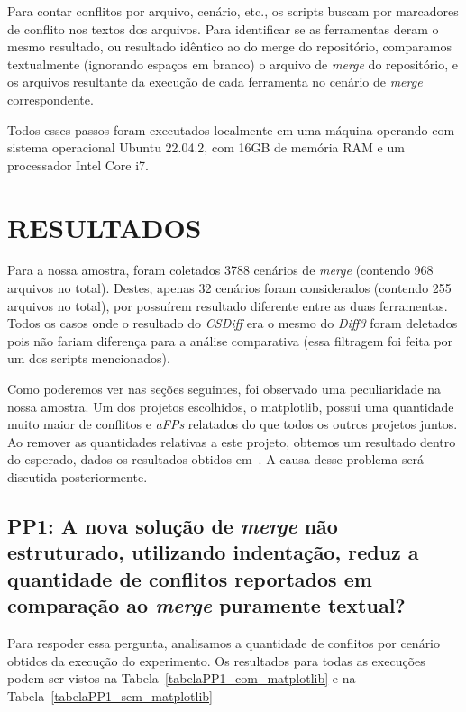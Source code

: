 Para contar conflitos por arquivo, cenário, etc., os scripts buscam por
marcadores de conflito nos textos dos arquivos. Para identificar se as
ferramentas deram o mesmo resultado, ou resultado idêntico ao do merge do
repositório, comparamos textualmente (ignorando espaços em branco) o arquivo de
\emph{merge} do repositório, e os arquivos resultante da execução de cada
ferramenta no cenário de \emph{merge} correspondente.

Todos esses passos foram executados localmente em uma máquina operando com
sistema operacional Ubuntu 22.04.2, com 16GB de memória RAM e um processador
Intel Core i7.

\section{RESULTADOS}

Para a nossa amostra, foram coletados 3788 cenários de \emph{merge} (contendo
968 arquivos no total). Destes, apenas 32 cenários foram considerados (contendo
255 arquivos no total), por possuírem resultado diferente entre as duas
ferramentas. Todos os casos onde o resultado do \emph{CSDiff} era o mesmo do
\emph{Diff3} foram deletados pois não fariam diferença para a análise
comparativa (essa filtragem foi feita por um dos scripts mencionados).

Como poderemos ver nas seções seguintes, foi observado uma peculiaridade na
nossa amostra. Um dos projetos escolhidos, o matplotlib, possui uma quantidade
muito maior de conflitos e \emph{aFPs} relatados do que todos os outros
projetos juntos. Ao remover as quantidades relativas a este projeto, obtemos um
resultado dentro do esperado, dados os resultados obtidos
em~\cite{clem21,heitor21}. A causa desse problema será discutida
posteriormente.

\subsection{PP1: A nova solução de \emph{merge} não estruturado, utilizando
	indentação, reduz a quantidade de conflitos reportados em comparação ao
	\emph{merge} puramente textual?}

Para respoder essa pergunta, analisamos a quantidade de conflitos por cenário
obtidos da execução do experimento. Os resultados para todas as execuções podem
ser vistos na Tabela~\ref{tabelaPP1_com_matplotlib} e na
Tabela~\ref{tabelaPP1_sem_matplotlib}

